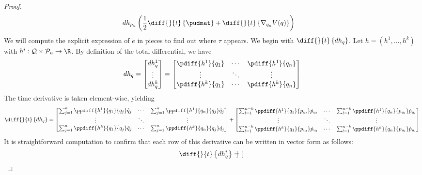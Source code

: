 \begin{proof}
\begin{align*}
         & dh_{p_u}\left(\frac{1}{2}\diff{}{t}\left\{\pudmat\right\} + 
         \diff{}{t}\left\{\nabla_{q_u}V(q)\right\} \right)
    \end{align*}
    We will compute the explicit expression of \(\ddot{e}\) in pieces to find
    out where \(\tau\) appears. 
    We begin with \(\diff{}{t}\left\{dh_q\right\}\). 
    Let \(h = (h^1,\ldots,h^k)\) with
    \(h^i : \mathcal{Q} \times \mathcal{P}_u \rightarrow \R\). By definition of
    the total differential, we have 
    \[
        dh_q = \begin{bmatrix}
            dh^1_q \\
            \vdots \\
            dh^k_q
        \end{bmatrix} = \begin{bmatrix}
        \pdiff{h^1}{q_1} & \cdots & \pdiff{h^1}{q_n} \\
        \vdots & \ddots & \vdots \\
        \pdiff{h^k}{q_1} & \cdots & \pdiff{h^k}{q_n}
        \end{bmatrix}
    \]
    The time derivative is taken element-wise, yielding
    \[
        \diff{}{t}\left\{dh_q\right\} = \begin{bmatrix}
            \sum_{j=1}^n \ppdiff{h^1}{q_1}{q_j}\dot{q}_j & \cdots & \sum_{j=1}^n
            \ppdiff{h^1}{q_n}{q_j}\dot{q}_j \\
            \vdots & \ddots & \vdots \\
            \sum_{j=1}^n \ppdiff{h^k}{q_1}{q_j}\dot{q}_j & \cdots & \sum_{j=1}^n
            \ppdiff{h^k}{q_n}{q_j}\dot{q}_j \\
        \end{bmatrix} + \begin{bmatrix}
            \sum_{l=1}^{n-k}\ppdiff{h^1}{q_1}{p_{u_l}}\dot{p}_{u_l} & \cdots &
            \sum_{l=1}^{n-k}\ppdiff{h^1}{q_n}{p_{u_l}}\dot{p}_{u_l} \\
            \vdots & \ddots & \vdots \\
            \sum_{l=1}^{n-k}\ppdiff{h^k}{q_1}{p_{u_l}}\dot{p}_{u_l} & \cdots & 
            \sum_{l=1}^{n-k}\ppdiff{h^k}{q_n}{p_{u_l}}\dot{p}_{u_l} \\
        \end{bmatrix}
    \]
    It is straightforward computation to confirm that each row of this
    derivative can be written in vector form as follows:
    \begin{align*}
        \diff{}{t}\left\{dh^i_q\right\} &= \begin{bmatrix}

\end{bmatrix}
\end{align*}
\end{proof}
